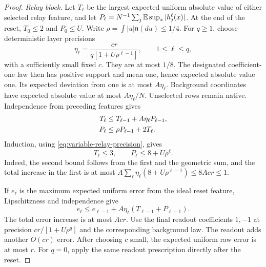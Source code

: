 \begin{proof}
\emph{Relay block.}
Let $T_\ell$ be the largest expected uniform absolute value of either
selected relay feature, and let
$P_\ell=N^{-1}\sum_j\mathbb E\sup_x|h_j^\ell(x)|$.
At the end of the reset, $T_0\le2$ and $P_0\le U$.
Write $\rho=\int|u|\mathfrak n(du)\le1/4$.
For $q\ge1$, choose deterministic layer precisions
\begin{equation}
 \eta_\ell=\frac{c r}{q[1+U\rho^{\ell-1}]},
 \qquad 1\le\ell\le q,
 \label{eq:variable-relay-precision}
\end{equation}
with a sufficiently small fixed $c$. They are at most $1/8$.
The designated coefficient-one law then has positive support and
mean one, hence expected absolute value one. Its expected deviation
from one is at most $A\eta_\ell$. Background coordinates have
expected absolute value at most $A\eta_\ell/N$. Unselected rows
remain native. Independence from preceding features gives
\begin{align}
 T_\ell&\le T_{\ell-1}+A\eta_\ell P_{\ell-1},\notag\\
 P_\ell&\le\rho P_{\ell-1}+2T_\ell.
 \label{eq:variable-relay-moments}
\end{align}
Induction, using \eqref{eq:variable-relay-precision}, gives
\[
 T_\ell\le3,\qquad P_\ell\le8+U\rho^\ell.
\]
Indeed, the second bound follows from the first and the geometric
sum, and the total increase in the first is at most
$A\sum_\ell\eta_\ell(8+U\rho^{\ell-1})\le8Acr\le1$.

If $e_\ell$ is the maximum expected uniform error from the ideal
reset feature, Lipschitzness and independence give
\[
 e_\ell\le e_{\ell-1}
       +A\eta_\ell(T_{\ell-1}+P_{\ell-1}).
\]
The total error increase is at most $Acr$. Use the final readout
coefficients $1,-1$ at precision
$c r/[1+U\rho^q]$ and the corresponding background law.
The readout adds another $O(cr)$ error. After choosing $c$ small,
the expected uniform raw error is at most $r$. For $q=0$, apply the
same readout prescription directly after the reset.


\end{proof}
